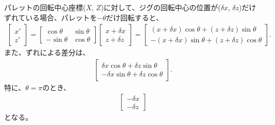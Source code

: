 \clearpage
パレットの回転中心座標($X$, $Z$)に対して、ジグの回転中心の位置が($\delta x$, $\delta z$)だけずれている場合、パレットを$-\theta$だけ回転すると、
\begin{align*}
  \left[
    \begin{array}{c}
      x'\\
      z'
    \end{array}
  \right]
  = \left[
    \begin{array}{cc}
      \cos\theta & \sin\theta\\
      -\sin\theta & \cos\theta
    \end{array}
  \right]\!\!
  \left[
    \begin{array}{c}
      x+\delta x\\
      z+\delta z
    \end{array}
  \right]
  = \left[
    \begin{array}{c}
      (x+\delta x)\cos\theta+(z+\delta z)\sin\theta\\
      -(x+\delta x)\sin\theta+(z+\delta z)\cos\theta
    \end{array}
  \right].
\end{align*}
また、ずれによる差分は、
\begin{align*}
  \left[
    \begin{array}{c}
      \delta x\cos\theta+\delta z\sin\theta\\
      -\delta x\sin\theta+\delta z\cos\theta
    \end{array}
  \right].
\end{align*}
特に、$\theta = \pi$のとき、
\begin{align*}
  \left[
    \begin{array}{c}
      -\delta x\\
      -\delta z
    \end{array}
  \right]
\end{align*}
となる。




